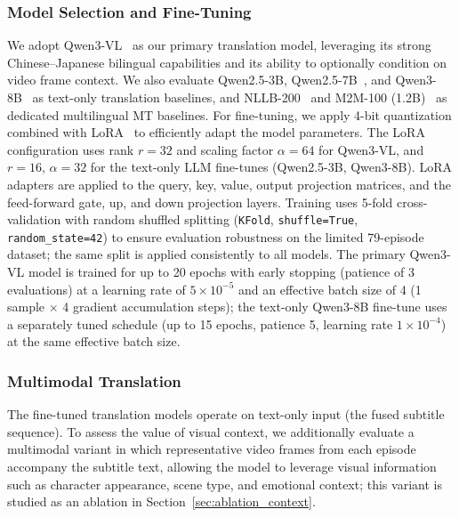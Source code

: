 \documentclass[mathematics,article,submit,xetex,moreauthors]{Definitions/mdpi}
\begin{document}
\subsubsection{Model Selection and Fine-Tuning}
We adopt Qwen3-VL~\cite{qwen3vl2025} as our primary translation model, leveraging its strong Chinese--Japanese bilingual capabilities and its ability to optionally condition on video frame context.
We also evaluate Qwen2.5-3B, Qwen2.5-7B~\cite{yang2024qwen2}, and Qwen3-8B~\cite{qwen3_2025} as text-only translation baselines, and NLLB-200~\cite{nllb2022} and M2M-100 (1.2B)~\cite{fan2021beyond} as dedicated multilingual MT baselines.
For fine-tuning, we apply 4-bit quantization combined with LoRA~\cite{hu2022lora} to efficiently adapt the model parameters.
The LoRA configuration uses rank $r = 32$ and scaling factor $\alpha = 64$ for Qwen3-VL, and $r = 16$, $\alpha = 32$ for the text-only LLM fine-tunes (Qwen2.5-3B, Qwen3-8B).
LoRA adapters are applied to the query, key, value, output projection matrices, and the feed-forward gate, up, and down projection layers.
Training uses 5-fold cross-validation with random shuffled splitting (\texttt{KFold}, \texttt{shuffle=True}, \texttt{random\_state=42}) to ensure evaluation robustness on the limited 79-episode dataset; the same split is applied consistently to all models.
The primary Qwen3-VL model is trained for up to 20 epochs with early stopping (patience of 3 evaluations) at a learning rate of $5 \times 10^{-5}$ and an effective batch size of 4 (1 sample $\times$ 4 gradient accumulation steps); the text-only Qwen3-8B fine-tune uses a separately tuned schedule (up to 15 epochs, patience 5, learning rate $1 \times 10^{-4}$) at the same effective batch size.

\subsubsection{Multimodal Translation}
The fine-tuned translation models operate on text-only input (the fused subtitle sequence).
To assess the value of visual context, we additionally evaluate a multimodal variant in which representative video frames from each episode accompany the subtitle text, allowing the model to leverage visual information such as character appearance, scene type, and emotional context; this variant is studied as an ablation in Section~\ref{sec:ablation_context}.
\end{document}
